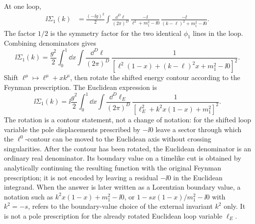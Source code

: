 At one loop,
\[
\begin{aligned}
  \ii\Sigma_1(k)
  &=
  \frac{(-\ii g)^2}{2}
  \int\frac{\dd^D\ell}{(2\pi)^D}\,
  \frac{-\ii}{\ell^2+m_1^2-\ii0}\,
  \frac{-\ii}{(k-\ell)^2+m_1^2-\ii0}.
\end{aligned}
\]
The factor \(1/2\) is the symmetry factor for the two identical \(\phi_1\)
lines in the loop. Combining denominators gives
\[
  \ii\Sigma_1(k)
  =
  \frac{g^2}{2}
  \int_0^1\dd x
  \int\frac{\dd^D\ell}{(2\pi)^D}\,
  \frac{1}{
    \left[\ell^2(1-x)+(k-\ell)^2x+m_1^2-\ii0\right]^2}.
\]
Shift \(\ell^\mu\mapsto\ell^\mu+xk^\mu\), then rotate the shifted energy
contour according to the Feynman prescription. The Euclidean expression is
\[
  \ii\Sigma_1(k)
  =
  \ii\frac{g^2}{2}
  \int_0^1\dd x
  \int\frac{\dd^D\ell_E}{(2\pi)^D}\,
  \frac{1}{
    \left[\ell_E^2+k^2x(1-x)+m_1^2\right]^2}.
\]
The rotation is a contour statement, not a change of notation: for the
shifted loop variable the pole displacements prescribed by \(-\ii0\) leave a
sector through which the \(\ell^0\)-contour can be moved to the Euclidean
axis without crossing singularities.  After the contour has been rotated, the
Euclidean denominator is an ordinary real denominator.  Its boundary value on a
timelike cut is obtained by analytically continuing the resulting function with
the original Feynman prescription; it is not encoded by leaving a residual
\(-\ii0\) in the Euclidean integrand.  When the answer is later written as a
Lorentzian boundary value, a notation such as
\(k^2x(1-x)+m_1^2-\ii0\), or
\(1-sx(1-x)/m_1^2-\ii0\) with \(k^2=-s\), refers to the boundary-value
choice of the external invariant \(k^2\) only.  It is not a pole prescription
for the already rotated Euclidean loop variable \(\ell_E\).

\begin{center}
\end{center}

